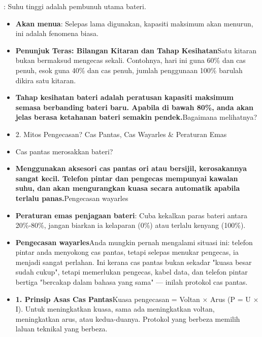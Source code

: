 


: Suhu tinggi adalah pembunuh utama bateri.

\begin{itemize}
  \item \textbf{Akan menua}: Selepas lama digunakan, kapasiti maksimum akan menurun, ini adalah fenomena biasa.
  \item \textbf{Penunjuk Teras: Bilangan Kitaran dan Tahap Kesihatan}Satu kitaran bukan bermaksud mengecas sekali. Contohnya, hari ini guna 60\% dan cas penuh, esok guna 40\% dan cas penuh, jumlah penggunaan 100\% barulah dikira satu kitaran.
  \item \textbf{Tahap kesihatan bateri adalah peratusan kapasiti maksimum semasa berbanding bateri baru. Apabila di bawah 80\%, anda akan jelas berasa ketahanan bateri semakin pendek.}Bagaimana melihatnya?
\end{itemize}


\begin{itemize}
  \item 2. Mitos Pengecasan? Cas Pantas, Cas Wayarles \& Peraturan Emas
  \item Cas pantas merosakkan bateri?
  \item \textbf{Menggunakan aksesori cas pantas ori atau bersijil, kerosakannya sangat kecil. Telefon pintar dan pengecas mempunyai kawalan suhu, dan akan mengurangkan kuasa secara automatik apabila terlalu panas.}Pengecasan wayarles
\end{itemize}


\begin{itemize}
  \item \textbf{Peraturan emas penjagaan bateri}: Cuba kekalkan paras bateri antara 20\%-80\%, jangan biarkan ia kelaparan (0\%) atau terlalu kenyang (100\%).
  \item \textbf{Pengecasan wayarles}Anda mungkin pernah mengalami situasi ini: telefon pintar anda menyokong cas pantas, tetapi selepas menukar pengecas, ia menjadi sangat perlahan. Ini kerana cas pantas bukan sekadar "kuasa besar sudah cukup", tetapi memerlukan pengecas, kabel data, dan telefon pintar bertiga "bercakap dalam bahasa yang sama" — inilah protokol cas pantas.
  \item \textbf{1. Prinsip Asas Cas Pantas}Kuasa pengecasan = Voltan × Arus (P = U × I). Untuk meningkatkan kuasa, sama ada meningkatkan voltan, meningkatkan arus, atau kedua-duanya. Protokol yang berbeza memilih laluan teknikal yang berbeza.
\end{itemize}

